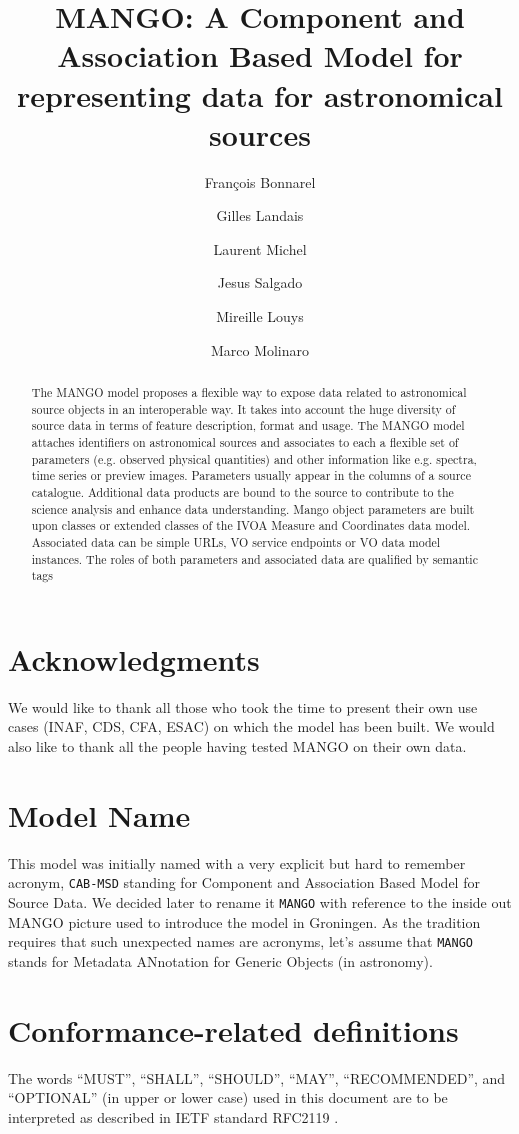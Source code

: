 \documentclass[11pt,a4paper]{ivoa}
\title{MANGO: A Component and Association Based Model for representing data for astronomical sources}
\author{François Bonnarel}
\author{Gilles Landais}
\author{Laurent Michel}
\author{Jesus Salgado}
\author{Mireille Louys}
\author{Marco Molinaro}
\begin{document}
\begin{abstract}
The MANGO model proposes a flexible way to expose data related to astronomical source objects in an interoperable way.
It takes into account the huge diversity of source data in terms of feature description, format and usage.
The MANGO model attaches identifiers on astronomical sources and associates to each a flexible set of parameters (e.g. observed physical quantities) and other information like e.g. spectra, time series or preview images.
Parameters usually appear in the columns of a source catalogue. Additional data products are bound to the source to contribute to the science analysis and enhance data understanding.
Mango object parameters are built upon classes or extended classes of the IVOA Measure and Coordinates data model.
Associated data can be simple URLs, VO service endpoints or VO data model instances.
The roles of both parameters and associated data are qualified by semantic tags

\end{abstract}


\section*{Acknowledgments}

We would like to thank all those who took the time to present their own use cases (INAF, CDS, CFA, ESAC) on which the model has been built.
We would also like to thank all the people having tested MANGO on their own data.

\section*{Model Name}
This model was initially named with a very explicit but hard to remember acronym, \texttt{CAB-MSD} standing for Component and Association Based Model for Source Data. We decided later to rename it \texttt{MANGO} with reference to the inside out MANGO picture used to introduce the model in Groningen. As the tradition requires that such unexpected names are acronyms, let's assume that \texttt{MANGO} stands for
Metadata ANnotation for Generic Objects (in astronomy).


\section*{Conformance-related definitions}

The words ``MUST'', ``SHALL'', ``SHOULD'', ``MAY'', ``RECOMMENDED'', and
``OPTIONAL'' (in upper or lower case) used in this document are to be
interpreted as described in IETF standard RFC2119 \citep{std:RFC2119}.
\end{document}

